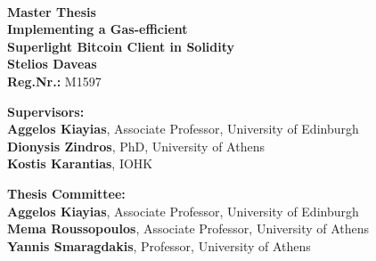 \

\begin{center}
    \vspace{3cm}
    \large \textbf{Master Thesis}\\
    \vspace{3cm}
    \textbf{Implementing a Gas-efficient\\Superlight Bitcoin Client in Solidity}\\
    \vspace{3cm}
    \large \textbf{Stelios Daveas}\\
    \textbf{Reg.Nr.:} M1597

    \vspace{5cm}
    \begin{flushleft}
        \textbf{Supervisors:}\\
        \hspace{2cm}
        \textbf{Aggelos Kiayias}, Associate Professor, University of Edinburgh\\
        \hspace{2cm}
        \textbf{Dionysis Zindros}, PhD, University of Athens\\
        \hspace{2cm}
        \textbf{Kostis Karantias}, IOHK

        \vspace{1cm}

        \textbf{Thesis Committee:}\\
        \hspace{2cm}
        \textbf{Aggelos Kiayias}, Associate Professor, University of Edinburgh\\
        \hspace{2cm}
        \textbf{Mema Roussopoulos}, Associate Professor, University of Athens\\
        \hspace{2cm}
        \textbf{Yannis Smaragdakis}, Professor, University of Athens

    \end{flushleft}
\end{center}
\pagebreak
